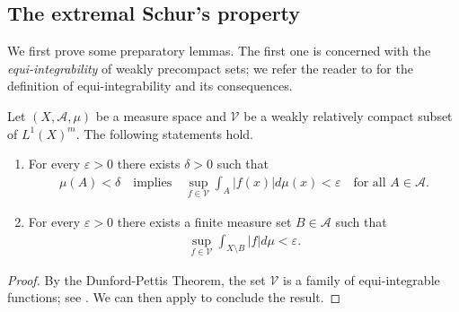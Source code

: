 \documentclass[hidelinks,onefignum,onetabnum]{siamart220329}
\begin{document}
\subsection{The extremal Schur's property}
We first prove some preparatory lemmas. The first one is concerned with the \textit{equi-integrability} of weakly precompact sets; we refer the reader to  \cite[Section 15]{Voigt2020} for the definition of equi-integrability and its consequences.

\begin{lemma}\label{lem:equi-integrable}
	Let $(X,\mathcal A,\mu)$ be a measure space and $\mathcal V $ be a weakly relatively compact subset of ${L^1(X)^m}$.
	The following statements hold.
	\begin{enumerate}
		\item For every $\varepsilon > 0$ there exists $\delta > 0$ 
		such that 
		\begin{align*}
			\mu(A)<\delta\quad\text{implies}\quad \sup_{f\in\mathcal V}\int_{A}|f(x)|d\mu(x)<\varepsilon\quad\text{for all $A\in\mathcal A$.}
		\end{align*}
		\item For every $\varepsilon > 0$ there exists a finite measure set $B \in \mathcal A$ 
		such that
		\begin{align*}
			\sup_{f \in \mathcal V} \int_{X \setminus B} |f| d\mu< \varepsilon.
		\end{align*}
	\end{enumerate}
\end{lemma}
\begin{proof}
	By the Dunford-Pettis Theorem, the set $\mathcal V$ is a family of equi-integrable functions; see \cite[Theorem 15.4]{Voigt2020}. We can then apply \cite[Lemma 15.3]{Voigt2020} to conclude the result.
\end{proof}
\end{document}
